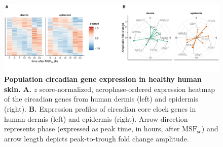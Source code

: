\begin{figure}[h!tb]
	\begin{center}
		\includegraphics[scale=0.55]{./Figures/suppfig2.pdf}
		\caption{\textbf{Population circadian gene expression in healthy human skin.} \textbf{A.} $z$ score-normalized, acrophase-ordered expression heatmap of the circadian genes from human dermis (left) and epidermis (right).\textbf{ B.} Expression profiles of circadian core clock genes in human dermis (left) and epidermis (right). Arrow direction represents phase (expressed as peak time, in hours, after $\textrm{MSF}_\textrm{sc}$) and arrow length depicts peak-to-trough fold change amplitude. }%
		\label{fig:suppfig2}
	\end{center}
\end{figure}


